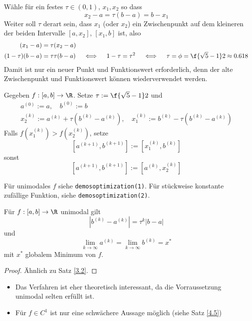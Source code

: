 \documentclass[11pt]{scrbook}
\begin{document}
\begin{seg}
	Wähle für ein festes $\tau \in (0,1)$, $x_1, x_2$ so dass
	\[
		x_2-a = \tau (b-a) = b-x_1
	\]
	Weiter soll $\tau$ derart sein, dass $x_1$ (oder $x_2$) ein Zwischenpunkt auf dem kleineren der beiden Intervalle $[a,x_2]$, $[x_1,b]$ ist, also
	\begin{align*}
		(x_1 - a) &= \tau (x_2 - a) \\
		(1-\tau)(b-a) &= \tau \tau (b-a)
		\quad \iff \quad 1 - \tau = \tau^2 \quad\iff\quad \tau = \phi = \f{\sqrt 5 - 1}2 \approx 0.618
	\end{align*}
	Damit ist nur ein neuer Punkt und Funktionswert erforderlich, denn der alte Zwischenpunkt und Funktionswert können wiederverwendet werden.
\end{seg}

\begin{df} \label{4.3}
	Gegeben $f:[a,b] \to \R$.
	Setze $\tau := \f {\sqrt 5 - 1}2$ und
	\begin{gather*}
		a^{(0)} := a, \quad b^{(0)} := b \\
		x_2^{(k)} := a^{(k)} + \tau(b^{(k)}-a^{(k)}), \quad x_1^{(k)} := b^{(k)} - \tau(b^{(k)}-a^{(k)})
	\end{gather*}
	Falls $f(x_1^{(k)}) > f(x_2^{(k)})$, setze
	\[
		[a^{(k+1)},b^{(k+1)}] := [x_1^{(k)}, b^{(k)}]
	\]
	sonst
	\[
		[a^{(k+1)},b^{(k+1)}] := [a^{(k)}, x_2^{(k)}]
	\]
\end{df}

\begin{ex*}
	Für unimodales $f$ siehe \texttt{demos\textunderscore optimization(1)}.
	Für stückweise konstante zufällige Funktion, siehe \texttt{demos\textunderscore optimization(2)}.
\end{ex*}

\begin{st} \label{4.4}
	Für $f: [a,b] \to \R$ unimodal gilt
	\[
		|b^{(k)} - a^{(k)}| = \tau^k |b-a|
	\]
	und
	\[
		\lim_{k\to \infty} a^{(k)} = \lim_{k\to \infty} b^{(k)} = x^*
	\]
	mit $x^*$ globalem Minimum von $f$.
	\begin{proof}
		Ähnlich zu Satz \ref{3.2}.
	\end{proof}
	\begin{note}
		\begin{itemize}
			\item
				Das Verfahren ist eher theoretisch interessant, da die Vorraussetzung unimodal selten erfüllt ist.
			\item
				Für $f\in C^1$ ist nur eine schwächere Aussage möglich (siehe Satz \ref{4.5})
		\end{itemize}
	\end{note}
\end{st}
\end{document}
